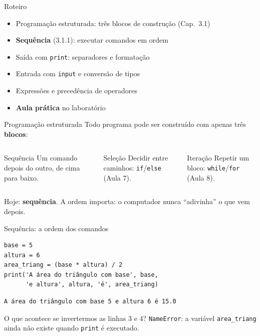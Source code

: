 \documentclass[aspectratio=169,10pt,t]{beamer}
\begin{document}
\capa

\begin{frame}{Roteiro}
  \begin{itemize}
    \item Programação estruturada: três blocos de construção (Cap.~3.1)
    \item \textbf{Sequência} (3.1.1): executar comandos em ordem
    \item Saída com \texttt{print}: separadores e formatação
    \item Entrada com \texttt{input} e conversão de tipos
    \item Expressões e precedência de operadores
    \item \textbf{Aula prática} no laboratório
  \end{itemize}
\end{frame}

\begin{frame}{Programação estruturada}
  Todo programa pode ser construído com apenas três \textbf{blocos}:
  \vspace{1ex}
  \begin{columns}[T]
    \begin{block}{Sequência}
      Um comando depois do outro, de cima para baixo.
    \end{block}
    \begin{block}{Seleção}
      Decidir entre caminhos: \texttt{if}/\texttt{else} (Aula 7).
    \end{block}
    \begin{block}{Iteração}
      Repetir um bloco: \texttt{while}/\texttt{for} (Aula 8).
    \end{block}
  \end{columns}
  \vspace{2ex}
  Hoje: \textbf{sequência}. A ordem importa: o computador nunca ``adivinha'' o que vem depois.
\end{frame}

\begin{frame}[fragile]{Sequência: a ordem dos comandos}
\begin{lstlisting}
base = 5
altura = 6
area_triang = (base * altura) / 2
print('A área do triângulo com base', base,
      'e altura', altura, 'é', area_triang)
\end{lstlisting}
\begin{lstlisting}[style=saida]
A área do triângulo com base 5 e altura 6 é 15.0
\end{lstlisting}
  \begin{alertblock}{O que acontece se invertermos as linhas 3 e 4?}
    \texttt{NameError}: a variável \texttt{area\_triang} ainda não existe quando \texttt{print} é executado.
  \end{alertblock}
\end{frame}
\end{document}
